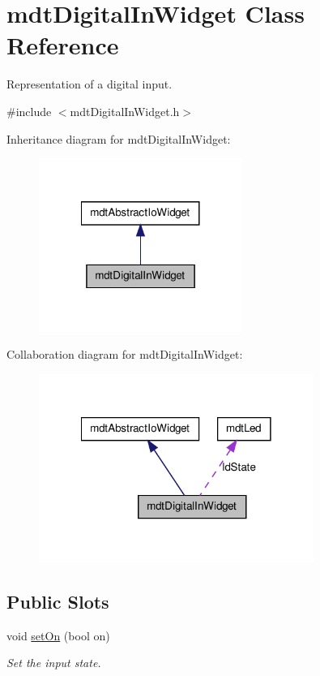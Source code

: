 \hypertarget{classmdt_digital_in_widget}{
\section{mdtDigitalInWidget Class Reference}
\label{classmdt_digital_in_widget}
}


Representation of a digital input.  




{\ttfamily \#include $<$mdtDigitalInWidget.h$>$}



Inheritance diagram for mdtDigitalInWidget:
\nopagebreak
\begin{figure}[H]
\begin{center}
\leavevmode
\includegraphics[width=188pt]{classmdt_digital_in_widget__inherit__graph}
\end{center}
\end{figure}


Collaboration diagram for mdtDigitalInWidget:
\nopagebreak
\begin{figure}[H]
\begin{center}
\leavevmode
\includegraphics[width=254pt]{classmdt_digital_in_widget__coll__graph}
\end{center}
\end{figure}
\subsection*{Public Slots}
\begin{DoxyCompactItemize}
\item 
\hypertarget{classmdt_digital_in_widget_a91725bf4b0651183703e4f2396715607}{
void \hyperlink{classmdt_digital_in_widget_a91725bf4b0651183703e4f2396715607}{setOn} (bool on)}
\label{classmdt_digital_in_widget_a91725bf4b0651183703e4f2396715607}

\begin{DoxyCompactList}\small\item\em Set the input state. \end{DoxyCompactList}\end{DoxyCompactItemize}
